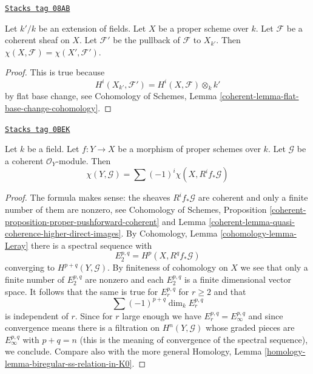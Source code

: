 \begin{lemma}
\label{varieties-lemma-euler-characteristic-extend-base-field}
\href{https://stacks.math.columbia.edu/tag/08AB}{\texttt{Stacks tag 08AB}}

Let $k'/k$ be an extension of fields. Let $X$ be a proper scheme
over $k$. Let $\mathcal{F}$ be a coherent sheaf on $X$.
Let $\mathcal{F}'$ be the pullback of $\mathcal{F}$ to $X_{k'}$.
Then $\chi(X, \mathcal{F}) = \chi(X', \mathcal{F}')$.
\end{lemma}

\begin{proof}
This is true because
$$
H^i(X_{k'}, \mathcal{F}') = H^i(X, \mathcal{F}) \otimes_k k'
$$
by flat base change, see
Cohomology of Schemes, Lemma \ref{coherent-lemma-flat-base-change-cohomology}.
\end{proof}

\begin{lemma}
\label{varieties-lemma-euler-characteristic-morphism}
\href{https://stacks.math.columbia.edu/tag/0BEK}{\texttt{Stacks tag 0BEK}}

Let $k$ be a field. Let $f : Y \to X$ be a morphism of proper schemes over
$k$. Let $\mathcal{G}$ be a coherent $\mathcal{O}_Y$-module. Then
$$
\chi(Y, \mathcal{G}) = \sum (-1)^i \chi(X, R^if_*\mathcal{G})
$$
\end{lemma}

\begin{proof}
The formula makes sense: the sheaves $R^if_*\mathcal{G}$ are coherent
and only a finite number of them are nonzero, see
Cohomology of Schemes,
Proposition \ref{coherent-proposition-proper-pushforward-coherent} and
Lemma \ref{coherent-lemma-quasi-coherence-higher-direct-images}.
By Cohomology, Lemma \ref{cohomology-lemma-Leray} there is a spectral
sequence with
$$
E_2^{p, q} = H^p(X, R^qf_*\mathcal{G})
$$
converging to $H^{p + q}(Y, \mathcal{G})$. By finiteness of cohomology
on $X$ we see that only a finite number of $E_2^{p, q}$ are nonzero
and each $E_2^{p, q}$ is a finite dimensional vector space. It follows
that the same is true for $E_r^{p, q}$ for $r \geq 2$ and that
$$
\sum (-1)^{p + q} \dim_k E_r^{p, q}
$$
is independent of $r$. Since for $r$ large enough we have
$E_r^{p, q} = E_\infty^{p, q}$ and since convergence means there
is a filtration on $H^n(Y, \mathcal{G})$ whose graded pieces are
$E_\infty^{p, q}$ with $p + q = n$ (this is the meaning of convergence
of the spectral sequence), we conclude.
Compare also with the more general
Homology, Lemma \ref{homology-lemma-biregular-ss-relation-in-K0}.
\end{proof}

